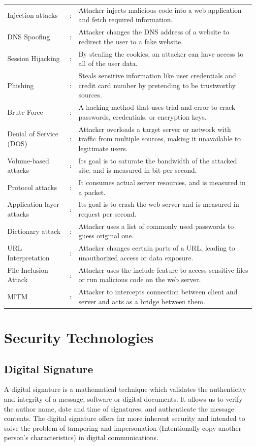 \begin{tabularx}{\textwidth}{llX}
   Injection attacks &:& Attacker injects malicious code into a web application and fetch required information. \\
   DNS Spoofing &:& Attacker changes the DNS address of a website to redirect the user to a fake website. \\
   Session Hijacking &:& By stealing the cookies, an attacker can have
   access to all of the user data. \\
   Phishing &:& Steals sensitive information like user credentials and credit card number by pretending to be trustworthy sources. \\
   Brute Force &:& A hacking method that uses trial-and-error to crack passwords, credentials, or encryption keys. \\
   Denial of Service (DOS) &:& Attacker overloads a target server or network with traffic from multiple sources, making it unavailable to legitimate users. \\
   Volume-based attacks &:& Its goal is to saturate the bandwidth of the attacked site, and is measured in bit per second. \\
   Protocol attacks &:& It consumes actual server resources, and is measured in a packet.\\
   Application layer attacks &:& Its goal is to crash the web server and is measured in request per second.\\
   Dictionary attack &:& Attacker uses a list of commonly used passwords to guess original one.\\
   URL Interpretation &:& Attacker changes certain parts of a URL, leading to unauthorized access or data exposure.\\
   File Inclusion Attack &:& Attacker uses the include feature to access sensitive files or run malicious code on the web server.\\
   MITM &:& Attacker to intercepts connection between client and server and acts as a bridge between them.
\end{tabularx}

\section{Security Technologies}
\subsection{Digital Signature}
A digital signature is a mathematical technique which validates the authenticity and integrity of a message, software or digital documents. It allows us to verify the author name, date and time of signatures, and authenticate the message contents. The digital signature offers far more inherent security and intended to solve the problem of tampering and impersonation (Intentionally copy another person's characteristics) in digital communications.

